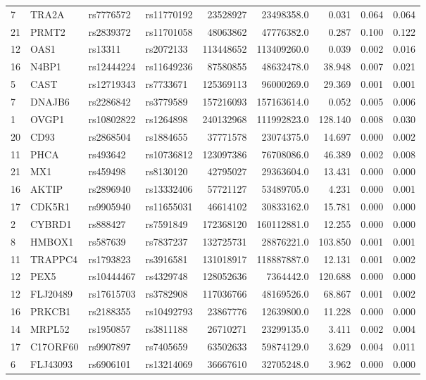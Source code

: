 \documentclass{article}
\begin{document}
\begin{table}[ht]
{\begin{threeparttable}
\begin{tabular}{llllrrrrr}
  7 & TRA2A & rs7776572 & rs11770192 & 23528927 & 23498358.0 & 0.031 & 0.064 & 0.064 \\
  21 & PRMT2 & rs2839372 & rs11701058 & 48063862 & 47776382.0 & 0.287 & 0.100 & 0.122 \\
  12 & OAS1 & rs13311 & rs2072133 & 113448652 & 113409260.0 & 0.039 & 0.002 & 0.016 \\
  16 & N4BP1 & rs12444224 & rs11649236 & 87580855 & 48632478.0 & 38.948 & 0.007 & 0.021 \\
  5 & CAST & rs12719343 & rs7733671 & 125369113 & 96000269.0 & 29.369 & 0.001 & 0.001 \\
  7 & DNAJB6 & rs2286842 & rs3779589 & 157216093 & 157163614.0 & 0.052 & 0.005 & 0.006 \\
  1 & OVGP1 & rs10802822 & rs1264898 & 240132968 & 111992823.0 & 128.140 & 0.008 & 0.030 \\
  20 & CD93 & rs2868504 & rs1884655 & 37771578 & 23074375.0 & 14.697 & 0.000 & 0.002 \\
  11 & PHCA & rs493642 & rs10736812 & 123097386 & 76708086.0 & 46.389 & 0.002 & 0.008 \\
  21 & MX1 & rs459498 & rs8130120 & 42795027 & 29363604.0 & 13.431 & 0.000 & 0.000 \\
  16 & AKTIP & rs2896940 & rs13332406 & 57721127 & 53489705.0 & 4.231 & 0.000 & 0.001 \\
  17 & CDK5R1 & rs9905940 & rs11655031 & 46614102 & 30833162.0 & 15.781 & 0.000 & 0.000 \\
  2 & CYBRD1 & rs888427 & rs7591849 & 172368120 & 160112881.0 & 12.255 & 0.000 & 0.000 \\
  8 & HMBOX1 & rs587639 & rs7837237 & 132725731 & 28876221.0 & 103.850 & 0.001 & 0.001 \\
  11 & TRAPPC4 & rs1793823 & rs3916581 & 131018917 & 118887887.0 & 12.131 & 0.001 & 0.002 \\
  12 & PEX5 & rs10444467 & rs4329748 & 128052636 & 7364442.0 & 120.688 & 0.000 & 0.000 \\
  12 & FLJ20489 & rs17615703 & rs3782908 & 117036766 & 48169526.0 & 68.867 & 0.001 & 0.002 \\
  16 & PRKCB1 & rs2188355 & rs10492793 & 23867776 & 12639800.0 & 11.228 & 0.000 & 0.000 \\
  14 & MRPL52 & rs1950857 & rs3811188 & 26710271 & 23299135.0 & 3.411 & 0.002 & 0.004 \\
  17 & C17ORF60 & rs9907897 & rs7405659 & 63502633 & 59874129.0 & 3.629 & 0.004 & 0.011 \\
  6 & FLJ43093 & rs6906101 & rs13214069 & 36667610 & 32705248.0 & 3.962 & 0.000 & 0.000 \\

\end{tabular}
\end{threeparttable}}
\end{table}
\end{document}
